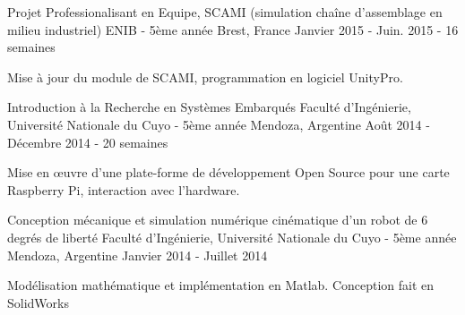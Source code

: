 

\begin{cventries}
\cventry
{Projet Professionalisant en Equipe, SCAMI (simulation chaîne d'assemblage en milieu industriel)} %
{ENIB - 5ème année} %
{Brest, France} %
{Janvier 2015 - Juin. 2015 - 16 semaines} %
{
	\begin{cvitems} %
		\item {Mise à jour du module de SCAMI, programmation en logiciel UnityPro. }
	\end{cvitems}
}
  \cventry
    {Introduction à la Recherche en Systèmes Embarqués} %
    {Faculté d'Ingénierie, Université Nationale du Cuyo - 5ème année} %
    {Mendoza, Argentine} %
    {Août 2014 - Décembre 2014 - 20 semaines} %
    {
      \begin{cvitems} %
        \item {Mise en \oe{uvre} d'une plate-forme de développement Open Source pour une carte Raspberry Pi, interaction avec l'hardware. }
      \end{cvitems}
    }
\cventry
{Conception mécanique et simulation numérique cinématique d'un robot de 6 degrés de liberté} %
{Faculté d'Ingénierie, Université Nationale du Cuyo - 5ème année} %
{Mendoza, Argentine} %
{Janvier 2014 - Juillet 2014} %
{
	\begin{cvitems} %
	\item {Modélisation mathématique et implémentation en Matlab. Conception fait en SolidWorks}
	\end{cvitems}
}



\end{cventries}
